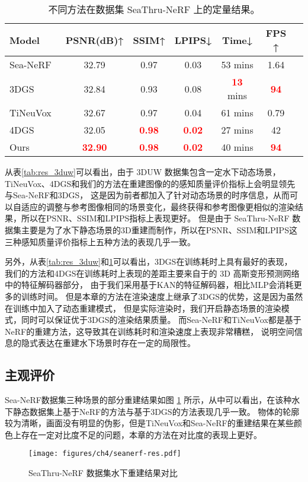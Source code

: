 \begin{table} [htbp]
    \small
    \centering
    \caption{不同方法在数据集 SeaThru-NeRF 上的定量结果。}
    \setlength{\tabcolsep}{10pt}
    \begin{tabular}{lcccccc} 
    \toprule
    Model  & PSNR(dB)↑ & SSIM↑ & LPIPS↓ & Time↓ &  FPS ↑  \\ 
    \midrule  
    Sea-NeRF\cite{seathru} & 32.79 & 0.97 & 0.03 & 53 mins & 1.64\\
    3DGS~\cite{3DGS} &32.84 & 0.93 & 0.08&\textcolor{red}{\textbf{13}} mins  &\textcolor{red}{\textbf{94}}\\
    TiNeuVox~\cite{tineuvox}  & 32.67 & 0.97 &  0.04 & 61 mins & 0.79\\ 
    4DGS\cite{4DGS} & 32.05&\textcolor{red}{\textbf{0.98}} &\textcolor{red}{\textbf{0.02}}& 27 mins&42 \\
    Ours & \textcolor{red}{\textbf{32.90}} & \textcolor{red}{\textbf{0.98}} & \textcolor{red}{\textbf{0.02}} & 40 mins & \textcolor{red}{\textbf{94}}\\
    \bottomrule
    \end{tabular}  
    
    \label{tab:res_seanerf}
\end{table}

从表\ref{tab:res_3duw}可以看出，由于 3DUW 数据集包含一定水下动态场景，TiNeuVox\cite{tineuvox}、4DGS\cite{4DGS}和我们的方法在重建图像的的感知质量评价指标上会明显领先与Sea-NeRF\cite{seathru}和3DGS\cite{3DGS}，
这是因为前者都加入了针对动态场景的时序信息，从而可以自适应的调整与参考图像相同的场景变化，最终获得和参考图像更相似的渲染结果，所以在PSNR、SSIM和LPIPS指标上表现更好。
但是由于 SeaThru-NeRF 数据集主要是为了水下静态场景的3D重建而制作，所以在PSNR、SSIM和LPIPS这三种感知质量评价指标上五种方法的表现几乎一致。

另外，从表\ref{tab:res_3duw}和\ref{tab:res_seanerf}可以看出，3DGS\cite{3DGS}在训练耗时上具有最好的表现，
我们的方法和4DGS\cite{4DGS}在训练耗时上表现的差距主要来自于的 3D 高斯变形预测网络中的特征解码器部分，
由于我们采用基于KAN的特征解码器，相比MLP会消耗更多的训练时间。
但是本章的方法在渲染速度上继承了3DGS\cite{3DGS}的优势，这是因为虽然在训练中加入了动态重建模式，
但是实际渲染时，我们开启静态场景的渲染模式，同时可以保证优于3DGS的渲染结果质量。
而Sea-NeRF\cite{seathru}和TiNeuVox\cite{tineuvox}都是基于NeRF的重建方法，这导致其在训练耗时和渲染速度上表现非常糟糕，
说明空间信息的隐式表达在重建水下场景时存在一定的局限性。


\subsection{主观评价}
Sea-NeRF\cite{seathru}数据集三种场景的部分重建结果如图 \ref{img:res_seanerf} 所示，从中可以看出，在该种水下静态数据集上基于NeRF的方法与基于3DGS的方法表现几乎一致。
物体的轮廓较为清晰，画面没有明显的伪影，但是TiNeuVox\cite{tineuvox}和Sea-NeRF\cite{seathru}的重建结果在某些颜色上存在一定对比度不足的问题，本章的方法在对比度的表现上更好。
\begin{figure}[htbp]
    \centering
    \texttt{[image: figures/ch4/seanerf-res.pdf]}
    \caption{SeaThru-NeRF 数据集水下重建结果对比}
    \label{img:res_seanerf}
\end{figure}

